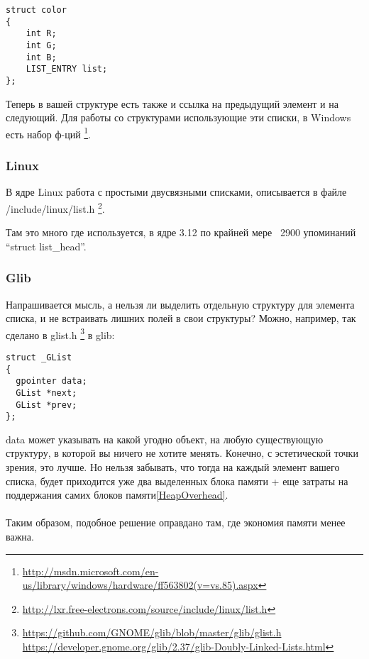 \begin{lstlisting}
struct color
{
	int R;
	int G;
	int B;
	LIST_ENTRY list;
};
\end{lstlisting}

Теперь в вашей структуре есть также и ссылка на предыдущий элемент и на следующий.
Для работы со структурами использующие эти списки, в Windows есть набор ф-ций
\footnote{\url{http://msdn.microsoft.com/en-us/library/windows/hardware/ff563802(v=vs.85).aspx}}.

\subsubsection{Linux}

В ядре Linux работа с простыми двусвязными списками, описывается в файле /include/linux/list.h
\footnote{\url{http://lxr.free-electrons.com/source/include/linux/list.h}}.

Там это много где используется, в ядре 3.12 по крайней мере ~2900 упоминаний ``struct list\_head''.

\subsubsection{Glib}

Напрашивается мысль, а нельзя ли выделить отдельную структуру для элемента списка, и не встраивать лишних полей
в свои структуры? Можно, например, так сделано в glist.h
\footnote{\url{https://github.com/GNOME/glib/blob/master/glib/glist.h} 
\url{https://developer.gnome.org/glib/2.37/glib-Doubly-Linked-Lists.html}} в glib:

\begin{lstlisting}
struct _GList
{
  gpointer data;
  GList *next;
  GList *prev;
};
\end{lstlisting}

data может указывать на какой угодно объект, на любую существующую структуру, в которой вы ничего не хотите менять.
Конечно, с эстетической точки зрения, это лучше. Но нельзя забывать, что тогда на каждый элемент вашего списка,
будет приходится уже два выделенных блока памяти + еще затраты на поддержания самих блоков памяти\ref{HeapOverhead}. \\
\\
Таким образом, подобное решение оправдано там, где экономия памяти менее важна.

